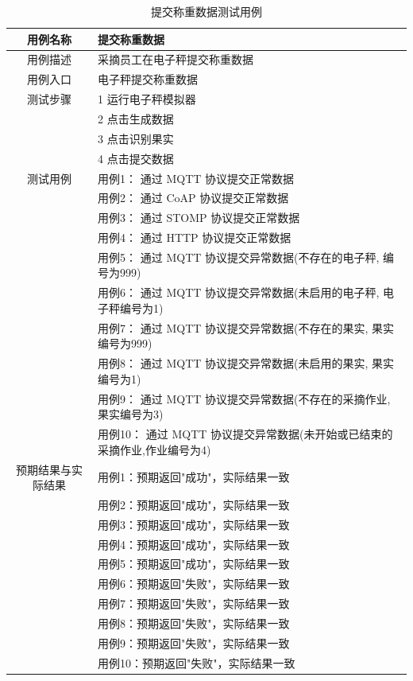 \begin{longtable}[ht]{|c|p{8cm}|}
\caption{提交称重数据测试用例}
\label{tab:uc-weigh-submit-test}
\\
\hline
用例名称 & 提交称重数据 \\
\hline
用例描述 & 采摘员工在电子秤提交称重数据 \\
\hline
用例入口 & 电子秤提交称重数据 \\
\hline
测试步骤 & 1 运行电子秤模拟器 \\
& 2 点击生成数据 \\
& 3 点击识别果实 \\
& 4 点击提交数据 \\
\hline
测试用例 & 用例1： 通过 MQTT 协议提交正常数据 \\
& 用例2： 通过 CoAP 协议提交正常数据 \\
& 用例3： 通过 STOMP 协议提交正常数据 \\
& 用例4： 通过 HTTP 协议提交正常数据 \\
& 用例5： 通过 MQTT 协议提交异常数据(不存在的电子秤, 编号为999) \\
\hline
& 用例6： 通过 MQTT 协议提交异常数据(未启用的电子秤, 电子秤编号为1) \\
& 用例7： 通过 MQTT 协议提交异常数据(不存在的果实, 果实编号为999) \\
& 用例8： 通过 MQTT 协议提交异常数据(未启用的果实, 果实编号为1) \\
& 用例9： 通过 MQTT 协议提交异常数据(不存在的采摘作业,果实编号为3) \\
& 用例10： 通过 MQTT 协议提交异常数据(未开始或已结束的采摘作业,作业编号为4) \\
\hline
预期结果与实际结果 & 用例1：预期返回"成功"，实际结果一致 \\
& 用例2：预期返回"成功"，实际结果一致 \\
& 用例3：预期返回"成功"，实际结果一致 \\
& 用例4：预期返回"成功"，实际结果一致 \\
& 用例5：预期返回"成功"，实际结果一致 \\
& 用例6：预期返回"失败"，实际结果一致 \\
& 用例7：预期返回"失败"，实际结果一致 \\
& 用例8：预期返回"失败"，实际结果一致 \\
& 用例9：预期返回"失败"，实际结果一致 \\
& 用例10：预期返回"失败"，实际结果一致 \\
\hline
\end{longtable}

